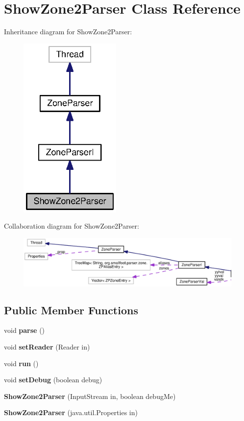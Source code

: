 \section{Show\+Zone2\+Parser Class Reference}
\label{classorg_1_1smallfoot_1_1parser_1_1zone_1_1ShowZone2Parser}


Inheritance diagram for Show\+Zone2\+Parser\+:\nopagebreak
\begin{figure}[H]
\begin{center}
\leavevmode
\includegraphics[width=142pt]{classorg_1_1smallfoot_1_1parser_1_1zone_1_1ShowZone2Parser__inherit__graph}
\end{center}
\end{figure}


Collaboration diagram for Show\+Zone2\+Parser\+:
\nopagebreak
\begin{figure}[H]
\begin{center}
\leavevmode
\includegraphics[width=350pt]{classorg_1_1smallfoot_1_1parser_1_1zone_1_1ShowZone2Parser__coll__graph}
\end{center}
\end{figure}
\subsection*{Public Member Functions}
\begin{DoxyCompactItemize}
\item 
void {\bf parse} ()
\item 
void {\bf set\+Reader} (Reader in)
\item 
void {\bf run} ()
\item 
void {\bf set\+Debug} (boolean debug)
\item 
{\bf Show\+Zone2\+Parser} (Input\+Stream in, boolean debug\+Me)
\item 
{\bf Show\+Zone2\+Parser} (java.\+util.\+Properties in)
\end{DoxyCompactItemize}
